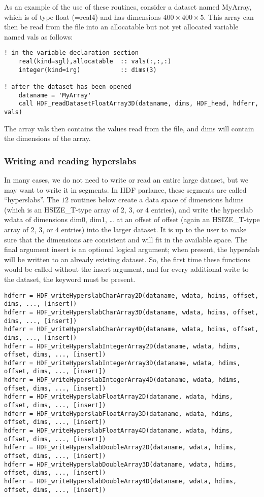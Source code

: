 \documentclass[DIV=calc, paper=letter, fontsize=11pt]{scrartcl}	 %
\begin{document}
As an example of the use of these routines, consider a dataset named \textsf{MyArray}, which 
is of type \textsf{float} (=real4) and has dimensions $400\times 400 \times 5$.  This array can
then be read from the file into an allocatable but not yet allocated variable named \textsf{vals}
as follows:
\begin{verbatim}
! in the variable declaration section
	real(kind=sgl),allocatable	:: vals(:,:,:)
	integer(kind=irg)			:: dims(3)
	
! after the dataset has been opened
	dataname = 'MyArray'
	call HDF_readDatasetFloatArray3D(dataname, dims, HDF_head, hdferr, vals)
\end{verbatim}
The array \textsf{vals} then contains the values read from the file, and \textsf{dims} will
contain the dimensions of the array.

\subsubsection{Writing and reading hyperslabs}
In many cases, we do not need to write or read an entire large dataset, but we may want to 
write it in segments.  In HDF parlance, these segments are called ``hyperslabs''.  The $12$ routines 
below create a data space of dimensions \textsf{hdims} (which is an \textsf{HSIZE\_T}-type array
of $2$, $3$, or $4$ entries), and write the hyperslab \textsf{wdata} of dimensions \textsf{dim0, dim1, \ldots}
at an offset of \textsf{offset} (again an \textsf{HSIZE\_T}-type array
of $2$, $3$, or $4$ entries) into the larger dataset.  It is up to the user to make sure that 
the dimensions are consistent and will fit in the available space.  The final argument \textsf{insert} is
an optional logical argument; when present, the hyperslab will be written to an already existing dataset.
So, the first time these functions would be called without the \textsf{insert} argument, and for every
additional write to the dataset, the keyword must be present.

{\footnotesize
\begin{verbatim}
hdferr = HDF_writeHyperslabCharArray2D(dataname, wdata, hdims, offset, dims, ..., [insert])
hdferr = HDF_writeHyperslabCharArray3D(dataname, wdata, hdims, offset, dims, ..., [insert])
hdferr = HDF_writeHyperslabCharArray4D(dataname, wdata, hdims, offset, dims, ..., [insert])
hdferr = HDF_writeHyperslabIntegerArray2D(dataname, wdata, hdims, offset, dims, ..., [insert])
hdferr = HDF_writeHyperslabIntegerArray3D(dataname, wdata, hdims, offset, dims, ..., [insert])
hdferr = HDF_writeHyperslabIntegerArray4D(dataname, wdata, hdims, offset, dims, ..., [insert])
hdferr = HDF_writeHyperslabFloatArray2D(dataname, wdata, hdims, offset, dims, ..., [insert])
hdferr = HDF_writeHyperslabFloatArray3D(dataname, wdata, hdims, offset, dims, ..., [insert])
hdferr = HDF_writeHyperslabFloatArray4D(dataname, wdata, hdims, offset, dims, ..., [insert])
hdferr = HDF_writeHyperslabDoubleArray2D(dataname, wdata, hdims, offset, dims, ..., [insert])
hdferr = HDF_writeHyperslabDoubleArray3D(dataname, wdata, hdims, offset, dims, ..., [insert])
hdferr = HDF_writeHyperslabDoubleArray4D(dataname, wdata, hdims, offset, dims, ..., [insert])
\end{verbatim}
}
\end{document}
